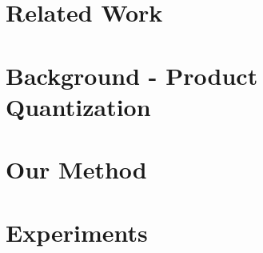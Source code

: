 \documentclass{article}  %
\begin{document}


\section{Related Work} \label{sec:relatedWork}


% 

\vspace{-1.5mm}
\section{Background - Product Quantization} \label{sec:background}
\vspace{-.5mm}



\vspace{-3mm}
\section{Our Method} \label{sec:method}
\vspace{-.5mm}



\section{Experiments} \label{sec:results}



\vspace{-.5mm}
\end{document}
